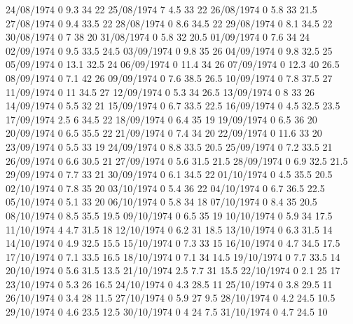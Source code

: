 24/08/1974  0      9.3    34     22 
25/08/1974  7      4.5    33     22 
26/08/1974  0      5.8    33     21.5 
27/08/1974  0      9.4    33.5   22 
28/08/1974  0      8.6    34.5   22 
29/08/1974  0      8.1    34.5   22 
30/08/1974  0      7      38     20 
31/08/1974  0      5.8    32     20.5 
01/09/1974  0      7.6    34     24 
02/09/1974  0      9.5    33.5   24.5 
03/09/1974  0      9.8    35     26 
04/09/1974  0      9.8    32.5   25 
05/09/1974  0      13.1   32.5   24 
06/09/1974  0      11.4   34     26 
07/09/1974  0      12.3   40     26.5 
08/09/1974  0      7.1    42     26 
09/09/1974  0      7.6    38.5   26.5 
10/09/1974  0      7.8    37.5   27 
11/09/1974  0      11     34.5   27 
12/09/1974  0      5.3    34     26.5 
13/09/1974  0      8      33     26 
14/09/1974  0      5.5    32     21 
15/09/1974  0      6.7    33.5   22.5 
16/09/1974  0      4.5    32.5   23.5 
17/09/1974  2.5    6      34.5   22 
18/09/1974  0      6.4    35     19 
19/09/1974  0      6.5    36     20 
20/09/1974  0      6.5    35.5   22 
21/09/1974  0      7.4    34     20 
22/09/1974  0      11.6   33     20 
23/09/1974  0      5.5    33     19 
24/09/1974  0      8.8    33.5   20.5 
25/09/1974  0      7.2    33.5   21 
26/09/1974  0      6.6    30.5   21 
27/09/1974  0      5.6    31.5   21.5 
28/09/1974  0      6.9    32.5   21.5 
29/09/1974  0      7.7    33     21 
30/09/1974  0      6.1    34.5   22 
01/10/1974  0      4.5    35.5   20.5 
02/10/1974  0      7.8    35     20 
03/10/1974  0      5.4    36     22 
04/10/1974  0      6.7    36.5   22.5 
05/10/1974  0      5.1    33     20 
06/10/1974  0      5.8    34     18 
07/10/1974  0      8.4    35     20.5 
08/10/1974  0      8.5    35.5   19.5 
09/10/1974  0      6.5    35     19 
10/10/1974  0      5.9    34     17.5 
11/10/1974  4      4.7    31.5   18 
12/10/1974  0      6.2    31     18.5 
13/10/1974  0      6.3    31.5   14 
14/10/1974  0      4.9    32.5   15.5 
15/10/1974  0      7.3    33     15 
16/10/1974  0      4.7    34.5   17.5 
17/10/1974  0      7.1    33.5   16.5 
18/10/1974  0      7.1    34     14.5 
19/10/1974  0      7.7    33.5   14 
20/10/1974  0      5.6    31.5   13.5 
21/10/1974  2.5    7.7    31     15.5 
22/10/1974  0      2.1    25     17 
23/10/1974  0      5.3    26     16.5 
24/10/1974  0      4.3    28.5   11 
25/10/1974  0      3.8    29.5   11 
26/10/1974  0      3.4    28     11.5 
27/10/1974  0      5.9    27     9.5 
28/10/1974  0      4.2    24.5   10.5 
29/10/1974  0      4.6    23.5   12.5 
30/10/1974  0      4      24     7.5 
31/10/1974  0      4.7    24.5   10 
